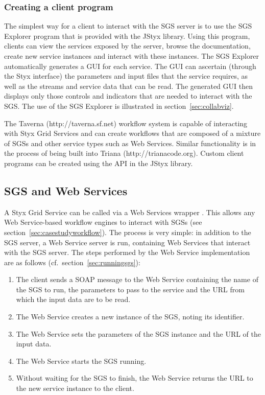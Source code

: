 \documentclass[a4paper]{article}
\begin{document}
\begin{multicols}{2}
\subsubsection{Creating a client program}
The simplest way for a client to interact with the SGS server is to use the SGS Explorer program that is provided with the JStyx library.  Using this program, clients can view the services exposed by the server, browse the documentation, create new service instances and interact with these instances.  The SGS Explorer automatically generates a GUI for each service.  The GUI can ascertain (through the Styx interface) the  parameters and input files that the service requires, as well as the streams and service data that can be read.  The generated GUI then displays only those controls and indicators that are needed to interact with the SGS.  The use of the SGS Explorer is illustrated in section~\ref{sec:collabviz}.

The Taverna (http://taverna.sf.net) workflow system is capable of interacting with Styx Grid Services and can create workflows that are composed of a mixture of SGSs and other service types such as Web Services.  Similar functionality is in the process of being built into Triana (http://trianacode.org).  Custom client programs can be created using the API in the JStyx library.  

\subsection{SGS and Web Services} \label{sec:webservices}
A Styx Grid Service can be called via a Web Services wrapper \cite{BlowerPoster:2004}.  This allows any Web Service-based workflow engines to interact with SGSs (see section~\ref{sec:casestudyworkflow}).  The process is very simple: in addition to the SGS server, a Web Service server is run, containing Web Services that interact with the SGS server.  The steps performed by the Web Service implementation are as follows (cf.\ section~\ref{sec:runningsgs}):

\begin{enumerate}
\item The client sends a SOAP message to the Web Service containing the name of the SGS to run, the parameters to pass to the service and the URL from which the input data are to be read.
\item The Web Service creates a new instance of the SGS, noting its identifier. \label{item:newsgs}
\item The Web Service sets the parameters of the SGS instance and the URL of the input data.
\item The Web Service starts the SGS running.
\item Without waiting for the SGS to finish, the Web Service returns the URL to the new service instance to the client.
\end{enumerate}


\end{multicols}
\end{document}

